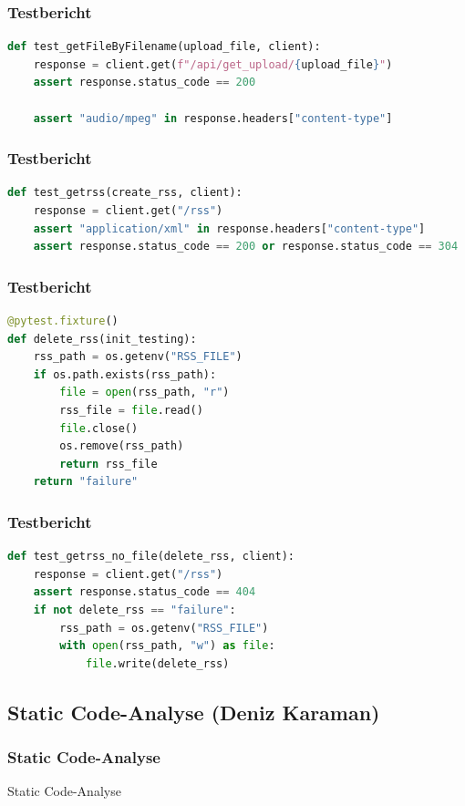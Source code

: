 \documentclass{beamer}
\begin{document}
\begin{frame}[fragile]
\frametitle{Testbericht}
\begin{lstlisting}[language=Python, caption=Test-Implementation von \texttt{/api/get\_upload}]
def test_getFileByFilename(upload_file, client): 
    response = client.get(f"/api/get_upload/{upload_file}") 
    assert response.status_code == 200 

    assert "audio/mpeg" in response.headers["content-type"] 
\end{lstlisting}
\end{frame}

\begin{frame}[fragile]
\frametitle{Testbericht}
\begin{lstlisting}[language=Python, caption=Test-Implementation von \texttt{/rss}]
def test_getrss(create_rss, client): 
    response = client.get("/rss") 
    assert "application/xml" in response.headers["content-type"] 
    assert response.status_code == 200 or response.status_code == 304 
\end{lstlisting}
\end{frame}

\begin{frame}[fragile]
\frametitle{Testbericht}
\begin{lstlisting}[language=Python, caption=Fixture zum löschen des RSS-Feeds]
@pytest.fixture() 
def delete_rss(init_testing): 
    rss_path = os.getenv("RSS_FILE") 
    if os.path.exists(rss_path): 
        file = open(rss_path, "r") 
        rss_file = file.read() 
        file.close() 
        os.remove(rss_path) 
        return rss_file 
    return "failure" 
\end{lstlisting}
\end{frame}

\begin{frame}[fragile]
\frametitle{Testbericht}
\begin{lstlisting}[language=Python, caption=Test-Implementation von \texttt{/rss} bei nicht vorhandenem Feed]
def test_getrss_no_file(delete_rss, client): 
    response = client.get("/rss") 
    assert response.status_code == 404 
    if not delete_rss == "failure": 
        rss_path = os.getenv("RSS_FILE") 
        with open(rss_path, "w") as file: 
            file.write(delete_rss) 
\end{lstlisting}
\end{frame}

\subsection{Static Code-Analyse (Deniz Karaman)}
\begin{frame}
\frametitle{Static Code-Analyse}
\begin{center}
  \huge Static Code-Analyse
\end{center}
\end{frame}
\end{document}
